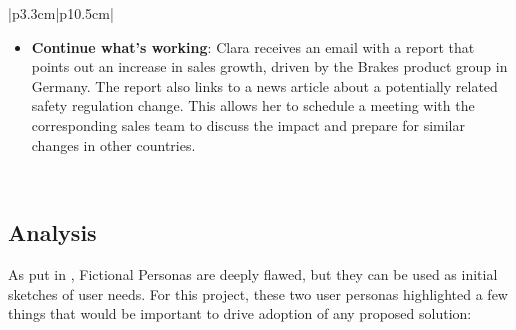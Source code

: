 \documentclass[a4paper]{report}
\begin{document}
\begin{tabular}{|p{3.3cm}|p{10.5cm}|}
\begin{minipage}[t]{\linewidth}
\begin{itemize}
        \item \textbf{Continue what's working}: Clara receives an email with a report that points out an increase in sales growth, driven by the Brakes product group in Germany. The report also links to a news article about a potentially related safety regulation change. This allows her to schedule a meeting with the corresponding sales team to discuss the impact and prepare for similar changes in other countries.
    \end{itemize}
    \vspace{0.05em}
\end{minipage} \\
\hline
\end{tabular}

\subsection{Analysis}

As put in \cite{ixdf_personas_2025}, Fictional Personas are deeply flawed, but they can be used as initial sketches of user needs. For this project, these two user personas highlighted a few things that would be important to drive adoption of any proposed solution:
\end{document}

